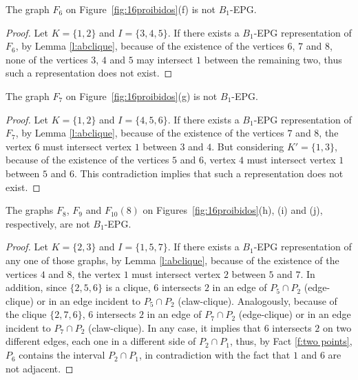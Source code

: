 \begin{lema}\label{lem:F_6}
The graph $F_6$ on Figure~\ref{fig:16proibidos}(f) is not   $B_1$-EPG.
\end{lema}
\begin{proof} Let $K=\{1,2\}$ and $I=\{3,4,5\}$. If there exists a $B_1$-EPG representation of $F_6$,  by Lemma \ref{l:abclique},  because of the existence of the vertices $6$, $7$ and $8$, none of the vertices $3$, $4$ and $5$
may intersect $1$ between the remaining two, thus such a representation does not exist.
 \end{proof} 


\begin{lema}\label{lem:F_7}
The graph $F_7$ on Figure~\ref{fig:16proibidos}(g) is not   $B_1$-EPG.
\end{lema}
\begin{proof} Let $K=\{1,2\}$ and $I=\{4,5,6\}$. If there exists a $B_1$-EPG representation of $F_7$,  by Lemma \ref{l:abclique},  because of the existence of the vertices  $7$ and $8$, the vertex $6$ must intersect  vertex $1$ between $3$ and $4$. But considering $K'=\{1,3\}$, because of the existence of the vertices $5$ and $6$,  vertex $4$ must intersect vertex $1$ between $5$ and $6$. This contradiction implies that such a representation does not exist.
 \end{proof} 
 
 \begin{lema}\label{lem:F_8_9_10(8)}
The graphs $F_8$, $F_9$ and $F_{10}(8)$ on Figures~\ref{fig:16proibidos}(h), (i) and (j), respectively, are not   $B_1$-EPG.
\end{lema}
\begin{proof} Let $K=\{2,3\}$ and $I=\{1,5,7\}$. If there exists a $B_1$-EPG representation of any one of those graphs,  by Lemma \ref{l:abclique},  because of the existence of the vertices  $4$ and $8$, the vertex $1$ must intersect  vertex $2$ between $5$ and $7$. In addition, since $\{2,5,6\}$ is a clique, $6$ intersects $2$ in an edge of $P_5\cap P_2$ (edge-clique) or in an edge incident to $P_5\cap P_2$ (claw-clique). Analogously, because of the clique $\{2,7,6\}$,  $6$ intersects $2$ in an edge of $P_7\cap P_2$ (edge-clique) or in an edge incident to $P_7\cap P_2$ (claw-clique). In any case, it implies that $6$ intersects $2$ on two different edges, each one in a different side of $P_2 \cap P_1$, thus, by Fact \ref{f:two points}, $P_6$ contains the interval  $P_2 \cap P_1$, in contradiction with the fact that $1$ and $6$ are not adjacent.
  \end{proof} 



